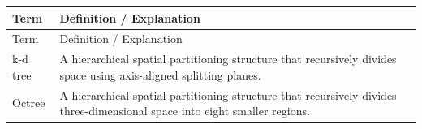 \renewcommand{\arraystretch}{1.25}

\begin{xltabular}{\textwidth}{|>{\raggedright\arraybackslash}p{0.25\textwidth}|>{\raggedright\arraybackslash}X|}
\hline
{}
Term & Definition / Explanation \\ \hline
\endfirsthead

\hline
{}
Term & Definition / Explanation \\ \hline
\endhead

k-d tree & A hierarchical spatial partitioning structure that recursively divides space using axis-aligned splitting planes. \\ \hline
Octree & A hierarchical spatial partitioning structure that recursively divides three-dimensional space into eight smaller regions. \\ \hline
\end{xltabular}
